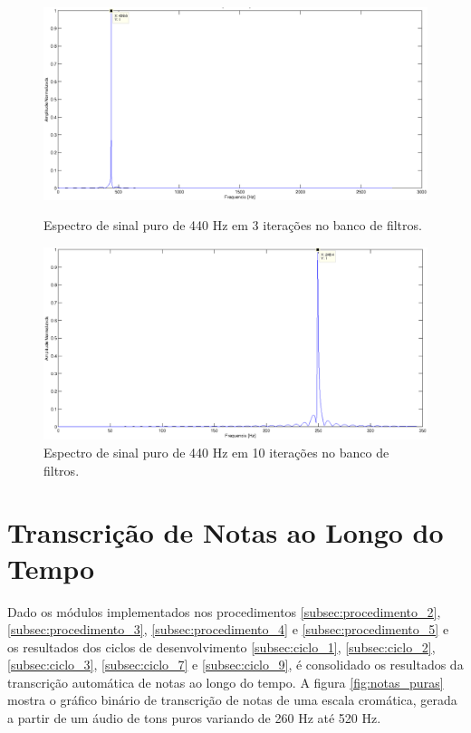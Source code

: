 \newpage
\begin{figure}[t]
    \centering
    \includegraphics[keepaspectratio=true,scale=0.5]{figuras/wavelet_deslocado_1.eps}
  \caption{Espectro de sinal puro de 440 Hz em 3 iterações no banco de filtros.}
  \label{fig:440_wavelets_1}
  \centering
    \includegraphics[keepaspectratio=true,scale=0.5]{figuras/wavelet_deslocado.eps}
  \caption{Espectro de sinal puro de 440 Hz em 10 iterações no banco de filtros.}
  \label{fig:440_wavelets_2}
\end{figure}

\section{Transcrição de Notas ao Longo do Tempo}
\label{sec:notas}
Dado os módulos implementados nos procedimentos \ref{subsec:procedimento_2}, \ref{subsec:procedimento_3}, \ref{subsec:procedimento_4} e \ref{subsec:procedimento_5} e os resultados dos ciclos de desenvolvimento \ref{subsec:ciclo_1}, \ref{subsec:ciclo_2}, \ref{subsec:ciclo_3}, \ref{subsec:ciclo_7} e \ref{subsec:ciclo_9}, é consolidado os resultados da transcrição automática de notas ao longo do tempo. A figura \ref{fig:notas_puras} mostra o gráfico binário de transcrição de notas de uma escala cromática, gerada a partir de um áudio de tons puros variando de 260 Hz até 520 Hz.

